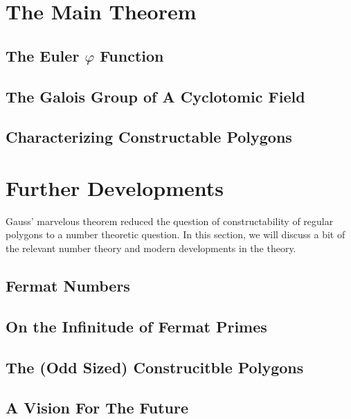 \documentclass[11pt,a4paper]{article}
\theoremstyle{theorem}
\theoremstyle{definition}
\theoremstyle{definition}
\theoremstyle{remark}
\theoremstyle{definition}
\theoremstyle{remark}
\begin{document}
\section{The Main Theorem}

\subsection{The Euler $\varphi$ Function}

\subsection{The Galois Group of A Cyclotomic Field}

\subsection{Characterizing Constructable Polygons}

\section{Further Developments}

Gauss' marvelous theorem reduced the question of constructability of regular polygons to a number theoretic question. In this section, we will discuss a bit of the relevant number theory and modern developments in the theory.

\subsection{Fermat Numbers}

\subsection{On the Infinitude of Fermat Primes}

\subsection{The (Odd Sized) Construcitble Polygons}

\subsection{A Vision For The Future}
\end{document}
